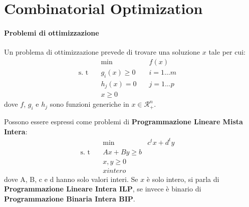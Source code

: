 \section{Combinatorial Optimization}
\paragraph{Problemi di ottimizzazione}
Un problema di ottimizzazione prevede di trovare una soluzione $x$ tale per cui:
\begin{equation}
	\begin{aligned}
		& \min \quad & f(x) & \\
		\textrm{s. t} \quad & g_i(x)\ge 0 \quad & i=1\dots m\\
		\quad & h_j(x)=0 \quad & j=1\dots p\\\quad
		& x \ge 0
	\end{aligned}
\end{equation}
dove $f$, $g_i$ e $h_j$ sono funzioni generiche in $x\in \mathcal{R}^n_+$.

Possono essere espressi come problemi di \textbf{Programmazione Lineare Mista Intera}:
\begin{equation}
	\begin{aligned}
		& \min \quad & c^tx+d^ty & \\
		\textrm{s. t} \quad & Ax+By\ge b & \\
		& x,y\ge 0 \quad & \\
		& x intero
	\end{aligned}
\end{equation}
dove A, B, c e d hanno solo valori interi. Se $x$ è solo intero, si parla di \textbf{Programmazione Lineare Intera ILP}, se invece è binario di \textbf{Programmazione Binaria Intera BIP}.

